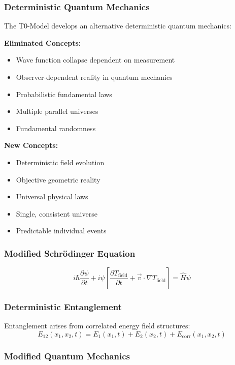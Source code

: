 \subsubsection{Deterministic Quantum Mechanics}

The T0-Model develops an alternative deterministic quantum mechanics:

\textbf{Eliminated Concepts:}
\begin{itemize}
	\item Wave function collapse dependent on measurement
	\item Observer-dependent reality in quantum mechanics
	\item Probabilistic fundamental laws
	\item Multiple parallel universes
	\item Fundamental randomness
\end{itemize}

\textbf{New Concepts:}
\begin{itemize}
	\item Deterministic field evolution
	\item Objective geometric reality
	\item Universal physical laws
	\item Single, consistent universe
	\item Predictable individual events
\end{itemize}

\subsubsection{Modified Schrödinger Equation}

\begin{equation}
	i\hbar\frac{\partial\psi}{\partial t} + i\psi\left[\frac{\partial T_{\text{field}}}{\partial t} + \vec{v} \cdot \nabla T_{\text{field}}\right] = \hat{H}\psi
\end{equation}

\subsubsection{Deterministic Entanglement}

Entanglement arises from correlated energy field structures:
\begin{equation}
	E_{12}(x_1,x_2,t) = E_1(x_1,t) + E_2(x_2,t) + E_{\text{corr}}(x_1,x_2,t)
\end{equation}

\subsubsection{Modified Quantum Mechanics}

